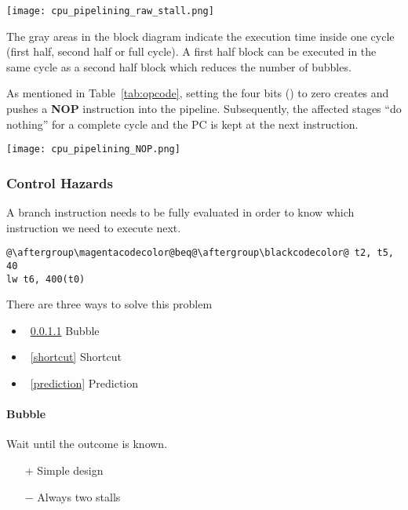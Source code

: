     \texttt{[image: cpu\_pipelining\_raw\_stall.png]}

    The gray areas in the block diagram indicate the execution time inside one cycle (first half, second half or full cycle). A first half block can be executed in the same cycle as a second half block which reduces the number of bubbles.

    \newpar{}
    As mentioned in Table~\ref{tab:opcode}, setting the four bits () to zero creates and pushes a \textbf{NOP} instruction into the pipeline.
    Subsequently, the affected stages ``do nothing'' for a complete cycle and the PC is kept at the next instruction.
    \begin{center}
        \texttt{[image: cpu\_pipelining\_NOP.png]}
    \end{center}

    \subsubsection{Control Hazards}\label{control hazards}

    A branch instruction needs to be fully evaluated in order to know which instruction we need to execute next.

    \begin{lstlisting}[escapechar=@]
@\aftergroup\magentacodecolor@beq@\aftergroup\blackcodecolor@ t2, t5, 40
lw t6, 400(t0)
\end{lstlisting}

    There are three ways to solve this problem
    \begin{itemize}
        \item~\ref{bubble} Bubble
        \item~\ref{shortcut} Shortcut
        \item~\ref{prediction} Prediction
    \end{itemize}

    \paragraph{Bubble}\label{bubble}

    Wait until the outcome is known.
    \begin{itemize}
        \item[+] Simple design
        \item[$-$] Always two stalls
    \end{itemize}

